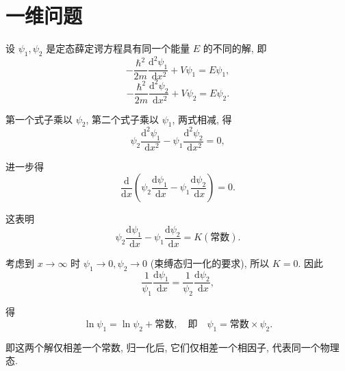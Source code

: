 \section{一维问题}
\begin{center}
	\textit{	}
\end{center}
\begin{proof*}
	设 $\psi_{1},\psi_{2}$ 是定态薛定谔方程具有同一个能量 $E$ 的不同的解, 即
	\[
	-\frac{\hbar^{2}}{2 m} \frac{\mathrm{d}^{2} \psi_{1}}{\mathrm{~d} x^{2}}+V \psi_{1}=E \psi_{1},
	\]
	\[
	-\frac{\hbar^{2}}{2 m} \frac{\mathrm{d}^{2} \psi_{2}}{\mathrm{~d} x^{2}}+V \psi_{2}=E \psi_{2}.
	\]
	
	第一个式子乘以 $\psi_{2}$, 第二个式子乘以 $\psi_{1}$, 两式相减, 得
	\[
	\psi_{2}\frac{\mathrm{d}^{2}\psi_{1}}{\mathrm{~d} x^{2}}-\psi_{1}\frac{\mathrm{d}^{2}\psi_{2}}{\mathrm{~d} x^{2}}=0,
	\]
	
	进一步得
	\[
	\frac{\mathrm{d}}{\mathrm{d} x}\left(\psi_{2}\frac{\mathrm{d}\psi_{1}}{\mathrm{~d} x}-\psi_{1}\frac{\mathrm{d}\psi_{2}}{\mathrm{~d} x}\right)=0.
	\]
	
	这表明
	\[
	\psi_{2}\frac{\mathrm{d}\psi_{1}}{\mathrm{~d} x}-\psi_{1}\frac{\mathrm{d}\psi_{2}}{\mathrm{~d} x}=K(\text{常数}).
	\]
	
	考虑到 $x\to\infty$ 时 $\psi_{1}\to 0,\psi_{2}\to 0$ (束缚态归一化的要求), 所以 $K=0$. 因此
	\[
	\frac{1}{\psi_{1}}\frac{\mathrm{d}\psi_{1}}{\mathrm{~d} x}=\frac{1}{\psi_{2}}\frac{\mathrm{d}\psi_{2}}{\mathrm{~d} x},
	\]
	
	得
	\[
	\ln \psi_{1}=\ln \psi_{2}+ \text{常数},\quad \text{即}\quad \psi_{1}= \text{常数} \times \psi_{2}.
	\]
	
	即这两个解仅相差一个常数, 归一化后, 它们仅相差一个相因子, 代表同一个物理态.
\end{proof*}
\begin{center}
\end{center}
